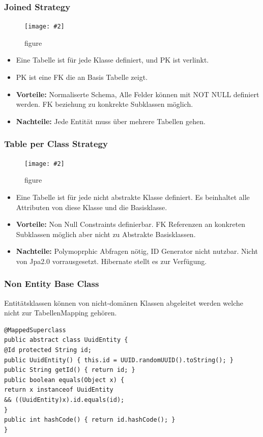 \documentclass[a4paper,10pt]{scrreprt}
\newcommand{\pic}[2][figure]{\begin{figure}[h]
 \centering
 \texttt{[image: \#2]}
 \caption{#1}
\end{figure}
}
\begin{document}
\subsubsection{Joined Strategy}
\pic{jts.png}
\begin{itemize}
 \item Eine Tabelle ist für jede Klasse definiert, und PK ist verlinkt.
 \item PK ist eine FK die an Basis Tabelle zeigt.
 \item  \textbf{Vorteile:} Normaliserte Schema, Alle Felder können mit NOT NULL definiert werden. FK beziehung zu 
konkrekte Subklassen möglich.
\item \textbf{Nachteile:} Jede Entität muss über mehrere Tabellen gehen.
\end{itemize}

\subsubsection{Table per Class Strategy}
\pic{tpcs.png}
\begin{itemize}
 \item Eine Tabelle ist für jede nicht abstrakte Klasse definiert. Es beinhaltet alle Attributen von diese Klasse und 
die Basisklasse.
\item \textbf{Vorteile:} Non Null Constraints definierbar. FK Referenzen an konkreten Subklassen möglich aber nicht zu 
Abstrakte Basisklassen.
\item \textbf{Nachteile:} Polymoprphic Abfragen nötig, ID Generator nicht nutzbar. Nicht von Jpa2.0 vorrausgesetzt. 
Hibernate stellt es zur Verfügung.
\end{itemize}

\subsubsection{Non Entity Base Class}
Entitätsklassen können von nicht-domänen Klassen abgeleitet werden welche nicht zur TabellenMapping gehören.
\begin{lstlisting}[caption=Entität Basisklasse]
 @MappedSuperclass
public abstract class UuidEntity {
@Id protected String id;
public UuidEntity() { this.id = UUID.randomUUID().toString(); }
public String getId() { return id; }
public boolean equals(Object x) {
return x instanceof UuidEntity
&& ((UuidEntity)x).id.equals(id);
}
public int hashCode() { return id.hashCode(); }
}
\end{lstlisting}
\end{document}
